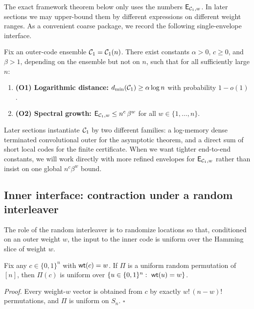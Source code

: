 The exact framework theorem below only uses the numbers \(\mathsf{E}_{{\mathcal{C}_1},w}\).
In later sections we may upper-bound them by different expressions on different weight ranges.
As a convenient coarse package, we record the following single-envelope interface.

\begin{assumption}
\label{ass:outer-interface}
Fix an outer-code ensemble \({\mathcal{C}_1}={\mathcal{C}_1}(n)\).
There exist constants \(\alpha>0\), \(c\ge 0\), and \(\beta>1\), depending on the ensemble but not on \(n\),
such that for all sufficiently large \(n\):
\begin{enumerate}
\item \textbf{(O1) Logarithmic distance:} \(d_{\min}({\mathcal{C}_1})\ge \alpha\log n\) with probability \(1-o(1)\).
\item \textbf{(O2) Spectral growth:} \(\mathsf{E}_{{\mathcal{C}_1},w}\le n^c\,\beta^w\) for all \(w\in\{1,\dots,n\}\).
\end{enumerate}
\end{assumption}




\noindent
Later sections instantiate \({\mathcal{C}_1}\) by two different families:
a log-memory dense terminated convolutional outer for the asymptotic theorem, and a direct sum of short local codes for
the finite certificate.
When we want tighter end-to-end constants, we will work directly with more refined envelopes for \(\mathsf{E}_{{\mathcal{C}_1},w}\)
rather than insist on one global \(n^c\beta^w\) bound.

\subsection{Inner interface: contraction under a random interleaver}
\label{sec:inner-interface}

The role of the random interleaver is to randomize locations so that, conditioned on an outer weight \(w\),
the input to the inner code is uniform over the Hamming slice of weight \(w\).

\begin{lemma}
\label{lem:interleaver-uniform-slice}
Fix any \(c\in\{0,1\}^n\) with \(\mathsf{wt}(c)=w\). If \(\Pi\) is a uniform random permutation of \([n]\),
then \(\Pi(c)\) is uniform over \(\{u\in\{0,1\}^n:\ \wt(u)=w\}\).
\end{lemma}

\noindent
\emph{Proof.}
Every weight-\(w\) vector is obtained from \(c\) by exactly \(w!\,(n-w)!\) permutations, and \(\Pi\) is uniform on \(S_n\). \(\square\)


